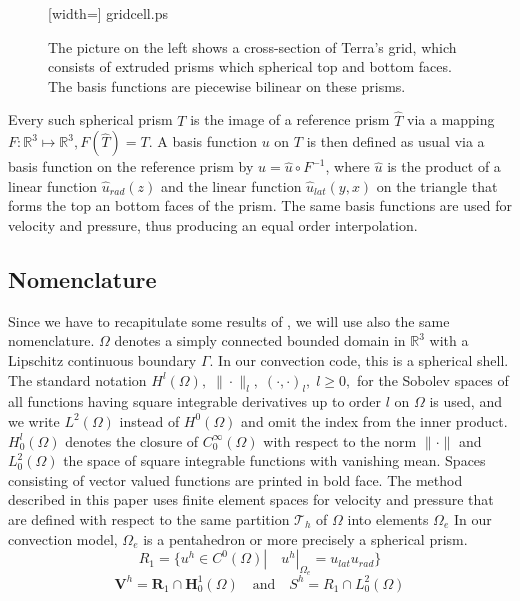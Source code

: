 \documentclass[times]{fldauth}
\newcommand{\mb}{\mathbf}
\newcommand{\bVh}{\mathbf V^h}
\begin{document}
\begin{figure}[h]
\begin{minipage}[b]{0.46\textwidth}
   [width=\textwidth]
   {gridcell.ps}
   \noindent
   \caption{The picture on the left shows a cross-section of Terra's grid,
   which consists of extruded prisms which spherical top and bottom faces. 
   The basis functions are piecewise bilinear on these prisms.
   \label{cross-section-cell}
   }  
\end{minipage}
\end{figure}
Every such spherical prism $T$ is the image of a reference prism $\hat T$ via a mapping $F:\mathbb R^3 \mapsto \mathbb R^3 ,F(\hat T)=T$.
A basis function $u$ on $ T$ is then defined as usual via a basis function on 
the reference prism by $u=\hat u \circ F^{-1} $, where $\hat u$ is the product of a linear function $\hat u_{rad}(z)$
and the linear function $\hat u_{lat}(y,x)$ on the triangle that forms the top an bottom faces  of the prism.
The same basis functions are used for velocity and pressure, thus producing an equal order interpolation.

\subsection{Nomenclature}
\label{sec:nom}
Since we have to recapitulate some results of \cite{bochev2007stabilization}, we will use also the same nomenclature.
$\Omega$ denotes a simply connected bounded domain in $\mathbb R^3$ with a Lipschitz continuous boundary
$\Gamma$. In our convection code, this is a spherical shell.
The standard notation $H^l(\Omega),
\; 
\| \cdot \|_l,
\; 
(\cdot ,\cdot)_l,
\;
l \ge 0,
$
for the Sobolev spaces of all functions having square integrable derivatives up to order $l$ on $\Omega$ is used, and we write
$L^2(\Omega)$ instead of $H^0(\Omega)$ and omit the index from the inner product.
$H^l_0(\Omega)$ denotes the closure of $C^\infty_0(\Omega)$ with respect to the norm $\| \cdot \|$ and $L_0^2(\Omega) $
the space of square integrable functions with vanishing mean.
Spaces consisting of vector valued functions are printed in bold face.
The method described in this paper uses finite element spaces for velocity and pressure that are defined with respect to the same partition
$\mathcal T_h$ of $\Omega$ into elements $\Omega_e$
In our convection model, $\Omega_e$ is a pentahedron or more precisely a spherical prism.
\begin{equation}
R_1 =\{u^h \in C^0(\Omega)| \quad u^h|_{\Omega_e} = u_{lat} u_{rad} \}
\end{equation}
\begin{equation}
\label{spaces}
\bVh=\mb R_1 \cap \mb H_0^1(\Omega) \quad \text{and} \quad S^h=R_1\cap L_0^2(\Omega)
\end{equation}
\end{document}
